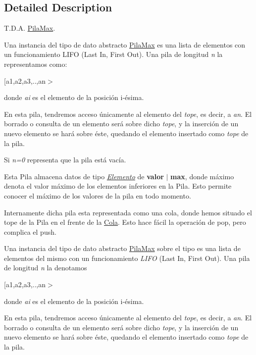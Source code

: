 \subsection{Detailed Description}
T.\+D.\+A. \hyperlink{classPilaMax}{Pila\+Max}. 

Una instancia del tipo de dato abstracto \hyperlink{classPilaMax}{Pila\+Max} es una lista de elementos con un funcionamiento L\+I\+FO (Last In, First Out). Una pila de longitud {\itshape n} la representamos como\+:


\begin{DoxyItemize}
\item \mbox{[}a1,a2,a3,..,an$>$
\end{DoxyItemize}

donde {\itshape ai} es el elemento de la posición i-\/ésima.

En esta pila, tendremos acceso únicamente al elemento del {\itshape tope}, es decir, a {\itshape an}. El borrado o consulta de un elemento será sobre dicho {\itshape tope}, y la inserción de un nuevo elemento se hará sobre éste, quedando el elemento insertado como {\itshape tope} de la pila.

Si {\itshape n=0} representa que la pila está vacía.

Esta Pila almacena datos de tipo {\itshape \hyperlink{structElemento}{Elemento}} de {\bfseries valor} $\vert$ {\bfseries max}, donde máximo denota el valor máximo de los elementos inferiores en la Pila. Esto permite conocer el máximo de los valores de la pila en todo momento.

Internamente dicha pila esta representada como una cola, donde hemos situado el tope de la Pila en el frente de la \hyperlink{classCola}{Cola}. Esto hace fácil la operación de pop, pero complica el push.

Una instancia del tipo de dato abstracto \hyperlink{classPilaMax}{Pila\+Max} sobre el tipo es una lista de elementos del mismo con un funcionamiento {\itshape L\+I\+FO} (Last In, First Out). Una pila de longitud {\itshape n} la denotamos


\begin{DoxyItemize}
\item \mbox{[}a1,a2,a3,..,an$>$
\end{DoxyItemize}

donde {\itshape ai} es el elemento de la posición i-\/ésima.

En esta pila, tendremos acceso únicamente al elemento del {\itshape tope}, es decir, a {\itshape an}. El borrado o consulta de un elemento será sobre dicho {\itshape tope}, y la inserción de un nuevo elemento se hará sobre éste, quedando el elemento insertado como {\itshape tope} de la pila.

